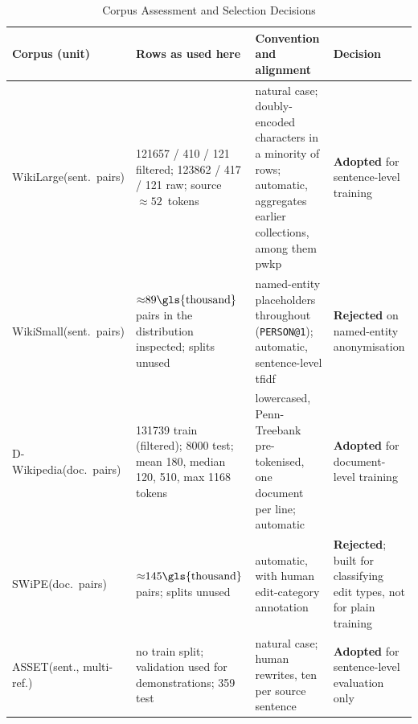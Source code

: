 \begin{table}[!tb]
	\centering
	\footnotesize
	\setlength{\tabcolsep}{3pt}
	\caption{Corpus Assessment and Selection Decisions}
	\label{tab:corpora}
	\begin{tabular}{@{}P{1.9cm}P{3.2cm}P{4.3cm}P{2.6cm}@{}}
		\toprule
		\textbf{Corpus (unit)}            & \textbf{Rows as used here}                                                                                     & \textbf{Convention and alignment}                                                                                               & \textbf{Decision}                                                           \\
		\midrule
		WikiLarge\newline (sent.~pairs)   & \num{121657} / 410 / 121 filtered; \num{123862} / 417 / 121 raw; source  \({\approx}52\)~tokens   & natural case; doubly-encoded characters in a minority of rows; automatic, aggregates earlier collections, among them \gls{pwkp} & \textbf{Adopted} for sentence-level training                                \\
		\addlinespace
		WikiSmall\newline (sent.~pairs)   & \({\approx}89\text{\gls{thousand}}\) pairs in the distribution inspected; splits unused                        & named-entity placeholders throughout (\texttt{PERSON@1}); automatic, sentence-level \gls{tfidf}                                 & \textbf{Rejected} on named-entity anonymisation                             \\
		\addlinespace
		D-Wikipedia\newline (doc.~pairs)  & \num{131739} train (filtered); \num{8000} test; mean 180, median 120,  510, max \num{1168} tokens & lowercased, Penn-Treebank pre-tokenised, one document per line; automatic                                                       & \textbf{Adopted} for document-level training                                \\
		\addlinespace
		SWiPE\newline (doc.~pairs)        & \({\approx}145\text{\gls{thousand}}\) pairs; splits unused                                                     & automatic, with human edit-category annotation                                                                                  & \textbf{Rejected}; built for classifying edit types, not for plain training \\
		\addlinespace
		ASSET\newline (sent., multi-ref.) & no train split; validation used for demonstrations; 359 test                                                   & natural case; human rewrites, ten per source sentence                                                                           & \textbf{Adopted} for sentence-level evaluation only                         \\

\end{tabular}
\end{table}
